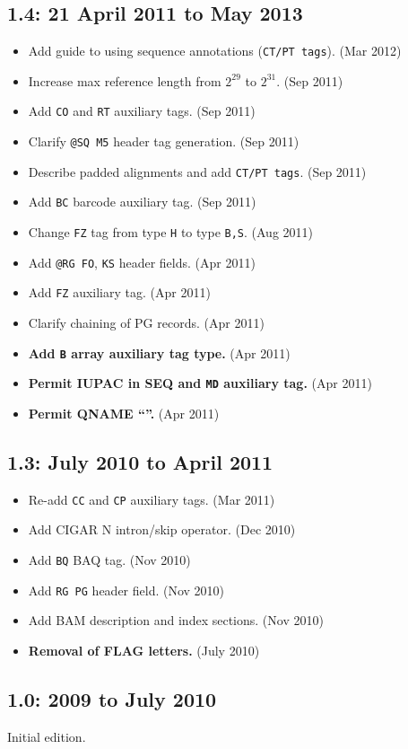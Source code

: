\documentclass[10pt]{article}
\begin{document}
\begin{appendices}
\subsection*{1.4: 21 April 2011 to May 2013}

\begin{itemize}
\item Add guide to using sequence annotations ({\tt CT/PT tags}). (Mar 2012)
\item Increase max reference length from $2^{29}$ to $2^{31}$. (Sep
  2011)
\item Add {\tt CO} and {\tt RT} auxiliary tags. (Sep 2011)
\item Clarify {\tt @SQ M5} header tag generation. (Sep 2011)
\item Describe padded alignments and add {\tt CT/PT tags}. (Sep 2011)
\item Add {\tt BC} barcode auxiliary tag. (Sep 2011)
\item Change {\tt FZ} tag from type {\tt H} to type {\tt B,S}. (Aug 2011)
\item Add {\tt @RG FO}, {\tt KS} header fields. (Apr 2011)
\item Add {\tt FZ} auxiliary tag. (Apr 2011)
\item Clarify chaining of PG records. (Apr 2011)
\item \textbf{Add {\tt B} array auxiliary tag type.} (Apr 2011)\
\item \textbf{Permit IUPAC in SEQ and {\tt MD} auxiliary tag.} (Apr 2011)
\item \textbf{Permit QNAME ``{\tt *}''.} (Apr 2011)
\end{itemize}

\subsection*{1.3: July 2010 to April 2011}

\begin{itemize}
\item Re-add {\tt CC} and {\tt CP} auxiliary tags. (Mar 2011)
\item Add CIGAR N intron/skip operator. (Dec 2010)
\item Add {\tt BQ} BAQ tag. (Nov 2010)
\item Add {\tt RG PG} header field. (Nov 2010)
\item Add BAM description and index sections. (Nov 2010)
\item \textbf{Removal of FLAG letters.} (July 2010)
\end{itemize}

\subsection*{1.0: 2009 to July 2010}

Initial edition.

\end{appendices}
\end{document}
